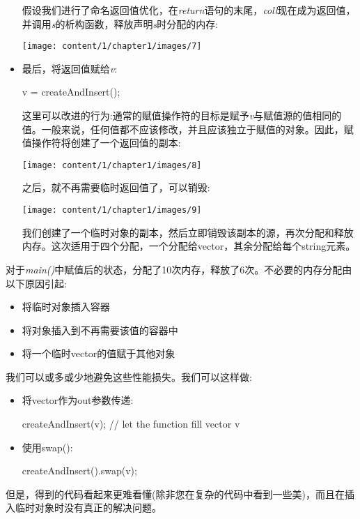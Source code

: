 \begin{itemize}
	假设我们进行了命名返回值优化，在\textit{return}语句的末尾，\textit{coll}现在成为返回值，并调用\textit{s}的析构函数，释放声明\textit{s}时分配的内存:
\begin{center}
		\texttt{[image: content/1/chapter1/images/7]}
	\end{center}
	\item 最后，将返回值赋给\textit{v}:
\begin{cppcode}
v = createAndInsert();
\end{cppcode}
	这里可以改进的行为:通常的赋值操作符的目标是赋予\textit{v}与赋值源的值相同的值。一般来说，任何值都不应该修改，并且应该独立于赋值的对象。因此，赋值操作符将创建了一个返回值的副本:
\begin{center}
		\texttt{[image: content/1/chapter1/images/8]}
	\end{center}
	之后，就不再需要临时返回值了，可以销毁:
\begin{center}
		\texttt{[image: content/1/chapter1/images/9]}
	\end{center}
	我们创建了一个临时对象的副本，然后立即销毁该副本的源，再次分配和释放内存。这次适用于四个分配，一个分配给vector，其余分配给每个string元素。
\end{itemize}

对于\textit{main()}中赋值后的状态，分配了10次内存，释放了6次。不必要的内存分配由以下原因引起:

\begin{itemize}
	\item 将临时对象插入容器
	\item 将对象插入到不再需要该值的容器中
	\item 将一个临时vector的值赋于其他对象
\end{itemize}

我们可以或多或少地避免这些性能损失。我们可以这样做:

\begin{itemize}
	\item 将vector作为out参数传递:
\begin{cppcode}
createAndInsert(v); // let the function fill vector v
\end{cppcode}
	\item 使用swap():
\begin{cppcode}
createAndInsert().swap(v);
\end{cppcode}
\end{itemize}

但是，得到的代码看起来更难看懂(除非您在复杂的代码中看到一些美)，而且在插入临时对象时没有真正的解决问题。

